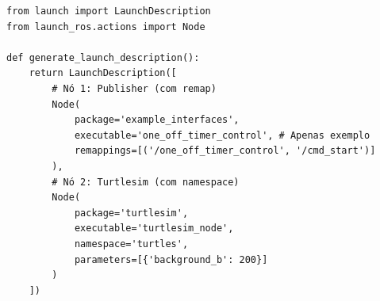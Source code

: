 \documentclass[preview,border=2pt]{standalone}
\begin{document}
\begin{lstlisting}[style=pythonstyle]
from launch import LaunchDescription
from launch_ros.actions import Node

def generate_launch_description():
    return LaunchDescription([
        # Nó 1: Publisher (com remap)
        Node(
            package='example_interfaces',
            executable='one_off_timer_control', # Apenas exemplo
            remappings=[('/one_off_timer_control', '/cmd_start')]
        ),
        # Nó 2: Turtlesim (com namespace)
        Node(
            package='turtlesim',
            executable='turtlesim_node',
            namespace='turtles',
            parameters=[{'background_b': 200}]
        )
    ])
\end{lstlisting}
\end{document}
